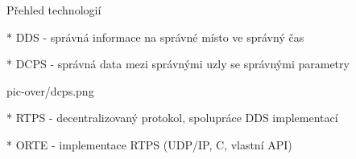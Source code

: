 \sec Přehled technologií

* DDS - správná informace na správné místo ve správný čas

* DCPS - správná data mezi správnými uzly se správnými parametry \nl

\centerline{\picw=14cm \inspic pic-over/dcps.png }

* RTPS - decentralizovaný protokol, spolupráce DDS implementací

* ORTE - implementace RTPS (UDP/IP, C, vlastní API)

